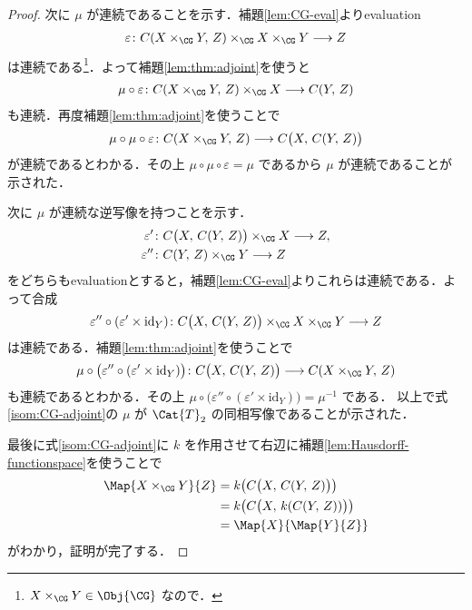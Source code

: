 \documentclass[algtopo_main]{subfiles}
\begin{document}
\begin{proof}
    \hrulefill

    次に $\mu$ が連続であることを示す．補題\ref{lem:CG-eval}よりevaluation
    \begin{align}
        \varepsilon \colon C(X \times_{\CG} Y,\, Z) \times_{\CG} X \times_{\CG} Y \lto Z 
    \end{align}
    は連続である\footnote{$X \times_{\CG}Y \in \Obj{\CG}$ なので．}．よって補題\ref{lem:thm:adjoint}を使うと
    \begin{align}
        \mu \circ \varepsilon \colon C(X \times_{\CG} Y,\, Z) \times_{\CG} X \lto C(Y,\, Z)
    \end{align}
    も連続．再度補題\ref{lem:thm:adjoint}を使うことで
    \begin{align}
        \mu\circ \mu \circ \varepsilon \colon C(X \times_{\CG} Y,\, Z) \lto C \bigl( X,\, C(Y,\, Z) \bigr) 
    \end{align}
    が連続であるとわかる．その上 $\mu \circ \mu \circ \varepsilon = \mu$ であるから $\mu$ が連続であることが示された．

    次に $\mu$ が連続な逆写像を持つことを示す．
    \begin{align}
        \varepsilon' &\colon C \bigl( X,\, C(Y,\, Z) \bigr) \times_{\CG} X \lto Z, \\
        \varepsilon'' &\colon C(Y,\, Z) \times_{\CG} Y \lto Z
    \end{align}
    をどちらもevaluationとすると，補題\ref{lem:CG-eval}よりこれらは連続である．よって合成
    \begin{align}
        \varepsilon'' \circ (\varepsilon' \times \mathrm{id}_Y) \colon C \bigl( X,\, C(Y,\, Z) \bigr) \times_{\CG} X \times_{\CG} Y \lto Z
    \end{align}
    は連続である．補題\ref{lem:thm:adjoint}を使うことで
    \begin{align}
        \mu \circ \bigl( \varepsilon'' \circ (\varepsilon' \times \mathrm{id}_Y) \bigr) \colon C \bigl( X,\, C(Y,\, Z) \bigr) \lto C(X \times_{\CG} Y,\, Z)
    \end{align}
    も連続であるとわかる．その上 $\mu \circ \bigl( \varepsilon'' \circ (\varepsilon' \times \mathrm{id}_Y) \bigr) = \mu^{-1}$ である．
    以上で式\eqref{isom:CG-adjoint}の $\mu$ が $\Cat{T}_2$ の同相写像であることが示された．

    最後に式\eqref{isom:CG-adjoint}に $k$ を作用させて右辺に補題\ref{lem:Hausdorff-functionspace}を使うことで
    \begin{align}
        \Map{X \times_{\CG} Y}{Z} &= k \bigl( C \bigl( X,\, C(Y,\, Z) \bigr)  \bigr) \\
        &= k \bigl( C \bigl( X,\, k(C (Y,\, Z)) \bigr)  \bigr) \\
        &= \Map{X}{\Map{Y}{Z}}
    \end{align}
    がわかり，証明が完了する．
        

\end{proof}
\end{document}
